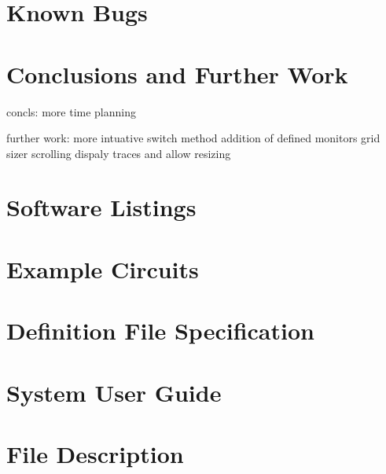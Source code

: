 \documentclass[a4paper,10pt]{article}  %
\begin{document}
\section{Known Bugs}
\label{sec:known-bugs}

\section{Conclusions and Further Work}
\label{sec:concl-furth-work}

concls:
more time planning 

further work:
more intuative switch method
addition of defined monitors
grid sizer
scrolling
dispaly traces and allow resizing

\appendix

\section{Software Listings}
\label{sec:software-listings}

\section{Example Circuits}
\label{sec:example-circuits}

\section{Definition File Specification}
\label{sec:defin-file-spec}

\section{System User Guide}
\label{sec:system-user-guide}

\section{File Description}
\label{sec:file-description}
\end{document}
